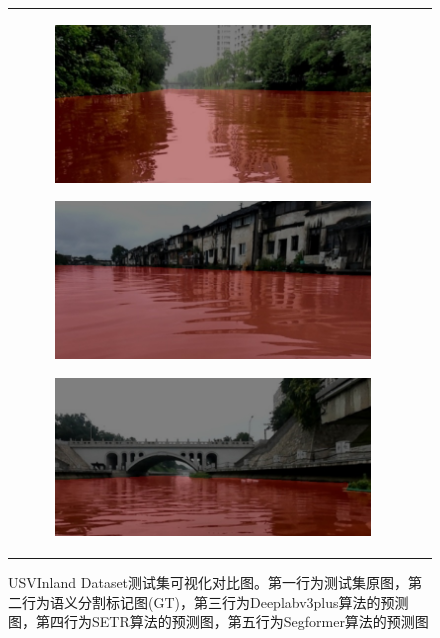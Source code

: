 \documentclass[cn,12pt,color=mine,scheme=chinese,bibstyle=gb7714-2015]{elegantbook}
\begin{document}
\begin{figure}[!htp]
\begin{tabular}{cc}
\begin{subfigure}[b]{0.23\linewidth}
			\caption{\label{fig:aa}}
		\end{subfigure}
		\begin{subfigure}[b]{0.23\linewidth}
			\centering\includegraphics[width=\linewidth]{results/test2segformer}\caption{\label{fig:bb}}
		\end{subfigure}
		\begin{subfigure}[b]{0.23\linewidth}
			\centering\includegraphics[width=\linewidth]{results/test3segformer}\caption{\label{fig:cc}}
		\end{subfigure}
		\begin{subfigure}[b]{0.23\linewidth}
			\centering\includegraphics[width=\linewidth]{results/test4segformer}\caption{\label{fig:dd}}
		\end{subfigure}
	\end{tabular}
	\caption{USVInland Dataset测试集可视化对比图。第一行为测试集原图，第二行为语义分割标记图(GT)，第三行为Deeplabv3plus算法的预测图，第四行为SETR算法的预测图，第五行为Segformer算法的预测图}
	\label{test1}
\end{figure}
\end{document}
